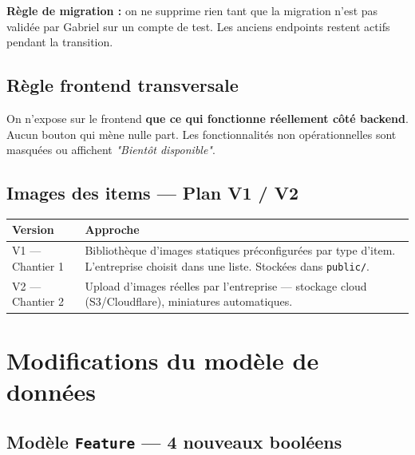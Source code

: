 \documentclass[11pt,a4paper]{article}
\newcommand{\slug}[1]{\texttt{\color{AGTDark}#1}}
\begin{document}
\begin{warnbox}
\textbf{Règle de migration :} on ne supprime rien tant que la migration n'est pas
validée par Gabriel sur un compte de test. Les anciens endpoints restent actifs
pendant la transition.
\end{warnbox}

\subsection{Règle frontend transversale}

\begin{notebox}
On n'expose sur le frontend \textbf{que ce qui fonctionne réellement côté backend}.
Aucun bouton qui mène nulle part. Les fonctionnalités non opérationnelles sont
masquées ou affichent \textit{"Bientôt disponible"}.
\end{notebox}

\subsection{Images des items — Plan V1 / V2}

\begin{center}
\begin{tabularx}{\textwidth}{lX}
\toprule
\textbf{Version} & \textbf{Approche} \\
\midrule
V1 — Chantier 1 & Bibliothèque d'images statiques préconfigurées par type d'item. L'entreprise choisit dans une liste. Stockées dans \texttt{public/}. \\[4pt]
V2 — Chantier 2 & Upload d'images réelles par l'entreprise — stockage cloud (S3/Cloudflare), miniatures automatiques. \\
\bottomrule
\end{tabularx}
\end{center}

\section{Modifications du modèle de données}

\subsection{Modèle \slug{Feature} — 4 nouveaux booléens}
\end{document}
